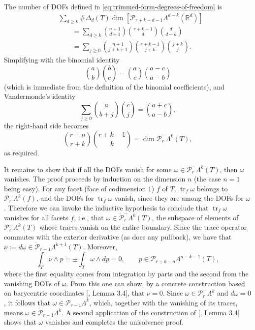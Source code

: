 {The number of DOFs defined in \eqref{eq:trimmed-form-degrees-of-freedom} is}
\[
\begin{aligned}
&\sum_{d\geq k}\#\Delta_d(T)\dim[\mathcal P_{r+k-d-1}\Lambda^{d-k}(\mathbb R^d)]\\
&\qquad=\sum_{d\geq k}\binom{n+1}{d+1}\binom{r+k-1}d\binom d{d-k}\\
&\qquad=\sum_{j\geq0}\binom{n+1}{j+k+1}\binom{r+k-1}{j+k}\binom{j+k}j.
\end{aligned}
\]
{Simplifying with the binomial identity}
\[
\binom ab\binom bc=\binom ac\binom{a-c}{a-b}
\]
{(which is immediate from the definition of the binomial coefficients), and Vandermonde's identity}
\[
\sum_{j\geq0}\binom a{b+j}\binom cj=\binom{a+c}{a-b},
\]
{the right-hand side becomes}
\[
\binom{r+n}{r+k}\binom{r+k-1}k=\dim\mathcal P_r^-\Lambda^k(T),
\]
{as required.}

{It remains to show that if all the DOFs vanish for some $\omega\in\mathcal P_r^-\Lambda^k(T)$, then $\omega$ vanishes. The proof proceeds by induction on the dimension $n$ (the case $n=1$ being easy). For any facet (face of codimension $1$) $f$ of $T$, $\operatorname{tr}_f\omega$ belongs to $\mathcal P_r^-\Lambda^k(f)$, and the DOFs for $\operatorname{tr}_f\omega$ vanish, since they are among the DOFs for $\omega$. Therefore we can invoke the inductive hypothesis to conclude that $\operatorname{tr}_f\omega$ vanishes for all facets $f$, i.e., that $\omega\in\mathring{\mathcal P}_r^-\Lambda^k(T)$, the subspace of elements of $\mathcal P_r^-\Lambda^k(T)$ whose traces vanish on the entire boundary. Since the trace operator commutes with the exterior derivative (as does any pullback), we have that $\nu:=d\omega\in\mathring{\mathcal P}_{r-1}\Lambda^{k+1}(T)$. Moreover,}
\[
\int_T\nu\wedge p=\pm\int_T\omega\wedge dp=0,\qquad p\in\mathcal P_{r+k-n}\Lambda^{n-k-1}(T),
\]
{where the first equality comes from integration by parts and the second from the vanishing DOFs of $\omega$. From this one can show, by a concrete construction based on barycentric coordinates [, Lemma 3.4], that $\nu=0$. Since $\omega\in\mathcal P_r^-\Lambda^k$ and $d\omega=0$, it follows that $\omega\in\mathcal P_{r-1}\Lambda^k$, which, together with the vanishing of its traces, means $\omega\in\mathring{\mathcal P}_{r-1}\Lambda^k$. A second application of the construction of [, Lemma 3.4] shows that $\omega$ vanishes and completes the unisolvence proof.}

